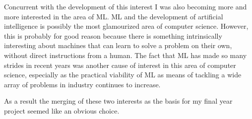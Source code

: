 Concurrent with the development of this interest I was also becoming more and more interested in the area
of ML.
ML and the development of artificial intelligence is possibly the most glamourized area
of computer science.
However, this is probably for good reason because there is something intrinsically interesting
about machines that can learn to solve a problem on their own, without direct instructions from a human.
The fact that ML has made so many strides in recent years was another cause of interest in
this area of computer science, especially as the practical viability of ML as means of tackling a wide array
of problems in industry continues to increase.

As a result the merging of these two interests as the basis for my final year project seemed like an obvious choice.